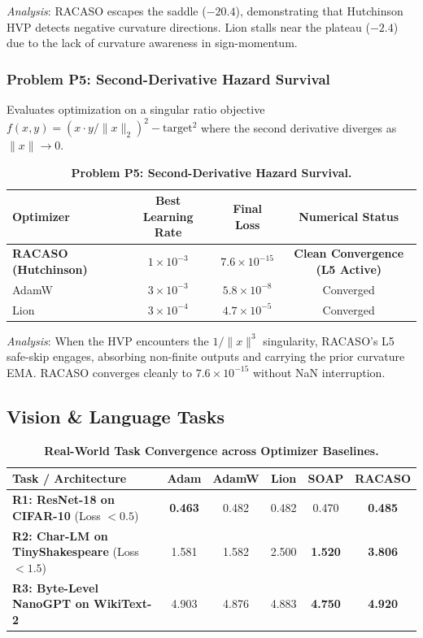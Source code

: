 \documentclass[11pt,a4paper]{article}
\begin{document}
\emph{Analysis}: RACASO escapes the saddle ($-20.4$), demonstrating that Hutchinson HVP detects negative curvature directions. Lion stalls near the plateau ($-2.4$) due to the lack of curvature awareness in sign-momentum.

\subsubsection{Problem P5: Second-Derivative Hazard Survival}
Evaluates optimization on a singular ratio objective $f(x, y) = (x \cdot y / \|x\|_2)^2 - \text{target}^2$ where the second derivative diverges as $\|x\| \to 0$.

\begin{table}[h!]
\centering
\small
\begin{tabular}{@{}lccc@{}}
\toprule
\textbf{Optimizer} & \textbf{Best Learning Rate} & \textbf{Final Loss} & \textbf{Numerical Status} \\ \midrule
\textbf{RACASO (Hutchinson)} & $1 \times 10^{-3}$ & \textbf{$7.6 \times 10^{-15}$} & \textbf{Clean Convergence (L5 Active)} \\
AdamW & $3 \times 10^{-3}$ & $5.8 \times 10^{-8}$ & Converged \\
Lion & $3 \times 10^{-4}$ & $4.7 \times 10^{-5}$ & Converged \\ \bottomrule
\end{tabular}
\caption{\textbf{Problem P5: Second-Derivative Hazard Survival.}}
\label{tab:p5}
\end{table}

\emph{Analysis}: When the HVP encounters the $1/\|x\|^3$ singularity, RACASO's L5 safe-skip engages, absorbing non-finite outputs and carrying the prior curvature EMA. RACASO converges cleanly to $7.6 \times 10^{-15}$ without NaN interruption.

\subsection{Vision \& Language Tasks}

\begin{table}[h!]
\centering
\small
\begin{tabularx}{\textwidth}{@{}lccccc@{}}
\toprule
\textbf{Task / Architecture} & \textbf{Adam} & \textbf{AdamW} & \textbf{Lion} & \textbf{SOAP} & \textbf{RACASO} \\ \midrule
\textbf{R1: ResNet-18 on CIFAR-10} (Loss $< 0.5$) & \textbf{0.463} & 0.482 & 0.482 & 0.470 & \textbf{0.485} \\
\textbf{R2: Char-LM on TinyShakespeare} (Loss $< 1.5$) & 1.581 & 1.582 & 2.500 & \textbf{1.520} & \textbf{3.806} \\
\textbf{R3: Byte-Level NanoGPT on WikiText-2} & 4.903 & 4.876 & 4.883 & \textbf{4.750} & \textbf{4.920} \\ \bottomrule
\end{tabularx}
\caption{\textbf{Real-World Task Convergence across Optimizer Baselines.}}
\label{tab:real_tasks}
\end{table}
\end{document}
